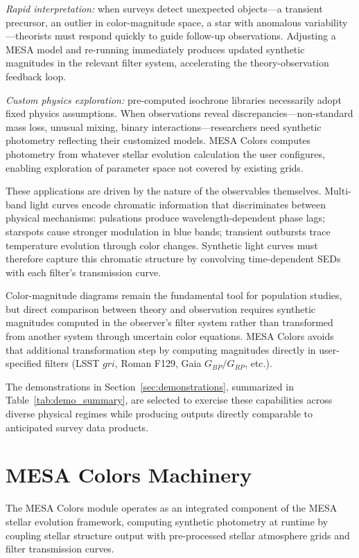 \documentclass[linenumbers,apj,twocolumn, floatfix]{aastex701}
\begin{document}
\textit{Rapid interpretation:} when surveys detect unexpected objects—a transient precursor, an outlier in color-magnitude space, a star with anomalous variability—theorists must respond quickly to guide follow-up observations. Adjusting a MESA model and re-running immediately produces updated synthetic magnitudes in the relevant filter system, accelerating the theory-observation feedback loop.

\textit{Custom physics exploration:} pre-computed isochrone libraries necessarily adopt fixed physics assumptions. When observations reveal discrepancies—non-standard mass loss, unusual mixing, binary interactions—researchers need synthetic photometry reflecting their customized models. MESA Colors computes photometry from whatever stellar evolution calculation the user configures, enabling exploration of parameter space not covered by existing grids.

These applications are driven by the nature of the observables themselves. Multi-band light curves encode chromatic information that discriminates between physical mechanisms: pulsations produce wavelength-dependent phase lags; starspots cause stronger modulation in blue bands; transient outbursts trace temperature evolution through color changes. Synthetic light curves must therefore capture this chromatic structure by convolving time-dependent SEDs with each filter's transmission curve.

Color-magnitude diagrams remain the fundamental tool for population studies, but direct comparison between theory and observation requires synthetic magnitudes computed in the observer's filter system rather than transformed from another system through uncertain color equations. MESA Colors avoids that additional transformation step by computing magnitudes directly in user-specified filters (LSST $gri$, Roman F129, Gaia $G_{BP}/G_{RP}$, etc.).

The demonstrations in Section~\ref{sec:demonstrations}, summarized in Table~\ref{tab:demo_summary}, are selected to exercise these capabilities across diverse physical regimes while producing outputs directly comparable to anticipated survey data products.


\section{MESA Colors Machinery}
\label{sec:methods}

The MESA Colors module operates as an integrated component of the MESA stellar evolution framework, computing synthetic photometry at runtime by coupling stellar structure output with pre-processed stellar atmosphere grids and filter transmission curves. 
\end{document}
